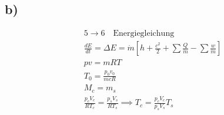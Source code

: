 

\subsection*{b)}

\begin{align*}
    5 \rightarrow 6 \quad \text{Energiegleichung} \\
    \frac{dE}{dt} = \Delta E = \dot{m} \left[ h + \frac{c^2}{2} + \sum \frac{Q}{\dot{m}} - \sum \frac{w}{\dot{m}} \right] \\
    p v = m R T \\
    T_0 = \frac{p_0 v_0}{m c R} \\
    M_c = m_s \\
    \frac{p_c V_c}{R T_c} = \frac{p_s V_s}{R T_s} \implies T_c = \frac{p_c V_c}{p_s V_s} T_s \\
\end{align*}
